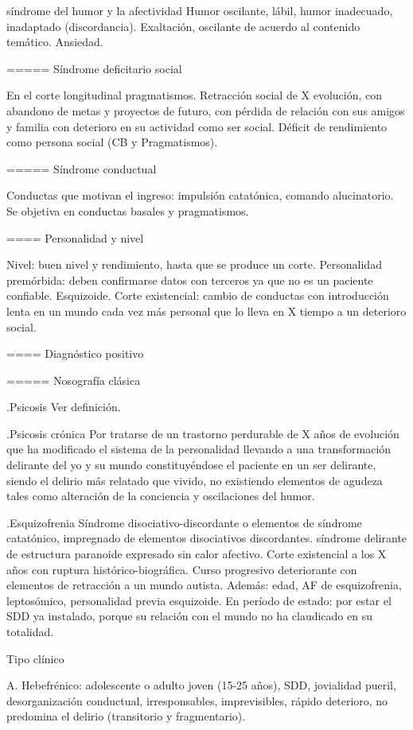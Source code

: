 síndrome del humor y la afectividad Humor oscilante, lábil, humor inadecuado, inadaptado (discordancia). Exaltación, oscilante de acuerdo al contenido temático. Ansiedad.

===== Síndrome deficitario social

En el corte longitudinal pragmatismos. Retracción social de X evolución, con abandono de metas y proyectos de futuro, con pérdida de relación con sus amigos y familia con deterioro en su actividad como ser social. Déficit de rendimiento como persona social (CB y Pragmatismos).

===== Síndrome conductual

Conductas que motivan el ingreso: impulsión catatónica, comando alucinatorio. Se objetiva en conductas basales y pragmatismos.

==== Personalidad y nivel

Nivel: buen nivel y rendimiento, hasta que se produce un corte. Personalidad premórbida: deben confirmarse datos con terceros ya que no es un paciente confiable. Esquizoide. Corte existencial: cambio de conductas con introducción lenta en un mundo cada vez más personal que lo lleva en X tiempo a un deterioro social.

==== Diagnóstico positivo

===== Nosografía clásica

.Psicosis
Ver definición.

.Psicosis crónica
Por tratarse de un trastorno perdurable de X años de evolución que ha modificado el sistema de la personalidad llevando a una transformación delirante del yo y su mundo constituyéndose el paciente en un ser delirante, siendo el delirio más relatado que vivido, no existiendo elementos de agudeza tales como alteración de la conciencia y oscilaciones del humor.

.Esquizofrenia
Síndrome disociativo-discordante o elementos de síndrome catatónico, impregnado de elementos disociativos discordantes. síndrome delirante de estructura paranoide expresado sin calor afectivo. Corte existencial a los X años con ruptura histórico-biográfica. Curso progresivo deteriorante con elementos de retracción a un mundo autista. Además: edad, AF de esquizofrenia, leptosómico, personalidad previa esquizoide. En período de estado: por estar el SDD ya instalado, porque su relación con el mundo no ha claudicado en su totalidad.

Tipo clínico

A. Hebefrénico: adolescente o adulto joven (15-25 años), SDD, jovialidad pueril, desorganización conductual, irresponsables, imprevisibles, rápido deterioro, no predomina el delirio (transitorio y fragmentario).

